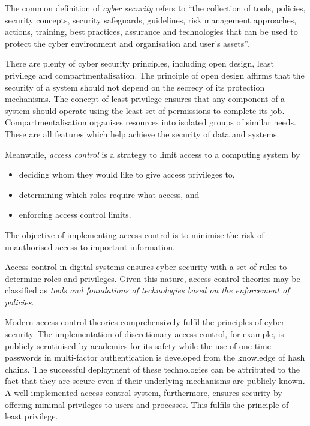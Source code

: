\documentclass{article}
\begin{document}
The common definition of \textit{cyber security} refers to ``the collection of tools, policies, security concepts, security safeguards, guidelines, risk management approaches, actions, training, best practices, assurance and technologies that can be used to protect the cyber environment and organisation and user’s assets''.\cite{itu}

There are plenty of cyber security principles, including open design, least privilege and compartmentalisation.\cite{principles}\cite{computer-security} The principle of open design affirms that the security of a system should not depend on the secrecy of its protection mechanisms. The concept of least privilege ensures that any component of a system should operate using the least set of permissions to complete its job. Compartmentalisation organises resources into isolated groups of similar needs. These are all features which help achieve the security of data and systems.

Meanwhile, \textit{access control} is a strategy to limit access to a computing system by\cite{access-control}
\begin{itemize}
    \item deciding whom they would like to give access privileges to,
    \item determining which roles require what access, and
    \item enforcing access control limits.
\end{itemize}
The objective of implementing access control is to minimise the risk of unauthorised access to important information.

Access control in digital systems ensures cyber security with a set of rules to determine roles and privileges. Given this nature, access control theories may be classified as \textit{tools and foundations of technologies based on the enforcement of policies}.

Modern access control theories comprehensively fulfil the principles of cyber security. The implementation of discretionary access control, for example, is publicly scrutinised by academics\cite{dac}\cite{safety-dac} for its safety while the use of one-time passwords in multi-factor authentication is developed from the knowledge of hash chains. The successful deployment of these technologies can be attributed to the fact that they are secure even if their underlying mechanisms are publicly known. A well-implemented access control system, furthermore, ensures security by offering minimal privileges to users and processes.\cite{crypto} This fulfils the principle of least privilege.
\end{document}
